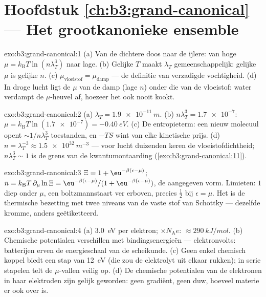 \section*{Hoofdstuk \ref{ch:b3:grand-canonical} --- Het grootkanonieke ensemble}

\begin{solution}{exo:b3:grand-canonical:1}
(a) Van de dichtere doos naar de ijlere: van hoge $\mu =
k_{\text{B}}T\ln(n\lambda_T^3)$ naar lage. (b) Gelijke $T$ maakt
$\lambda_T$ gemeenschappelijk: gelijke $\mu$ is gelijke $n$. (c)
$\mu_{\text{vloeistof}} = \mu_{\text{damp}}$ --- de definitie van
verzadigde vochtigheid. (d) In droge lucht ligt de $\mu$ van de damp (lage
$n$) onder die van de vloeistof: water verdampt de $\mu$-heuvel af, hoezeer
het ook nooit kookt.
\end{solution}

\begin{solution}{exo:b3:grand-canonical:2}
(a) $\lambda_T = \qty{1.9e-11}{m}$. (b) $n\lambda_T^3 =
\num{1.7e-7}$: $\mu = k_{\text{B}}T\ln(\num{1.7e-7}) =
\qty{-0.40}{eV}$. (c) De entropieterm: een nieuw molecuul opent
$\sim1/n\lambda_T^3$ toestanden, en $-TS$ wint van elke kinetische prijs.
(d) $n = \lambda_T^{-3} \approx \qty{1.5e32}{m^{-3}}$ --- voor lucht
duizenden keren de vloeistofdichtheid; $n\lambda_T^3 \sim 1$ is de grens
van de kwantumontaarding
(\cref{exo:b3:grand-canonical:11}).
\end{solution}

\begin{solution}{exo:b3:grand-canonical:3}
$\Xi = 1 + \eu^{-\beta(\epsilon-\mu)}$; $\bar n = k_{\text{B}}T\,
\partial_\mu\ln\Xi = \eu^{-\beta(\epsilon-\mu)}/(1 +
\eu^{-\beta(\epsilon-\mu)})$, de aangegeven vorm. Limieten: $1$ diep onder
$\mu$, een boltzmannstaart ver erboven, precies $\tfrac12$ bij $\epsilon = \mu$. Het is de thermische bezetting met twee niveaus van de vaste stof van
Schottky --- dezelfde kromme, anders geëtiketteerd.
\end{solution}

\begin{solution}{exo:b3:grand-canonical:4}
(a) \qty{3.0}{eV} per elektron; $\times N_{\text{A}}e$:
$\approx\qty{290}{kJ/mol}$. (b) Chemische potentialen verschillen met
bindingsenergieën --- elektronvolts: batterijen erven de energieschaal van
de scheikunde. (c) Geen enkel chemisch koppel biedt een stap van
\qty{12}{eV} (die zou de elektrolyt uit elkaar rukken); in serie stapelen
telt de $\mu$-vallen veilig op. (d) De chemische potentialen van de
elektronen in haar elektroden zijn gelijk geworden: geen gradiënt, geen
duw, hoeveel materie er ook over is.
\end{solution}


